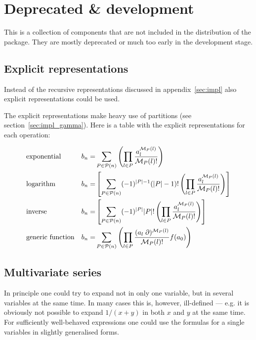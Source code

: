 \documentclass[titlepage]{article}
\begin{document}
\section{Deprecated \& development}
\label{sec:depr}

This is a collection of components that are not included in the
distribution of the package. They are mostly deprecated or much too
early in the development stage.

\subsection{Explicit representations}

Instead of the recursive representations discussed in
appendix~\ref{sec:impl} also explicit representations could be used.

The explicit representations make heavy use of partitions (see section~\ref{sec:impl_gamma}).
Here is a table with the explicit representations for each operation:


\begin{align}
  &\text{exponential} & b_n=& \sum_{P \in {\cal P}(n)} \left(\prod_{l \in P}
    \frac{a^{{\cal M}_P(l)}_l}{{\cal M}_P(l)!} \right)
  \notag\\
  &\text{logarithm} & b_n=&\left[\sum_{P \in {\cal P}(n)}
    (-1)^{|P|-1}(|P|-1)!\left(\prod_{l \in P} \frac{a^{{\cal
            M}_P(l)}_l}{{\cal M}_P(l)!} \right)\right]
  \notag\\
  &\text{inverse} & b_n=&\left[\sum_{P \in {\cal P}(n)}
    (-1)^{|P|}|P|!\left(\prod_{l \in P} \frac{a^{{\cal M}_P(l)}_l}{{\cal
          M}_P(l)!} \right)\right]
  \notag\\
  &\text{generic function}& b_n=& \sum_{P \in {\cal P}(n)} \left(\prod_{l \in P}
    \frac{(a_l \;\partial)^{{\cal M}_P(l)}}{{\cal M}_P(l)!}
    f(a_0)\right)
\label{eq:expl}
\end{align}

\subsection{Multivariate series}
\label{sec:multi_var}

In principle one could try to expand not in only one variable, but in
several variables at the same time. In many cases this is, however,
ill-defined --- e.g. it is obviously not possible to expand $1/(x+y)$ in
both $x$ and $y$ at the same time. For sufficiently well-behaved
expressions one could use the formulas for a single variables in slightly
generalised forms.
\end{document}
